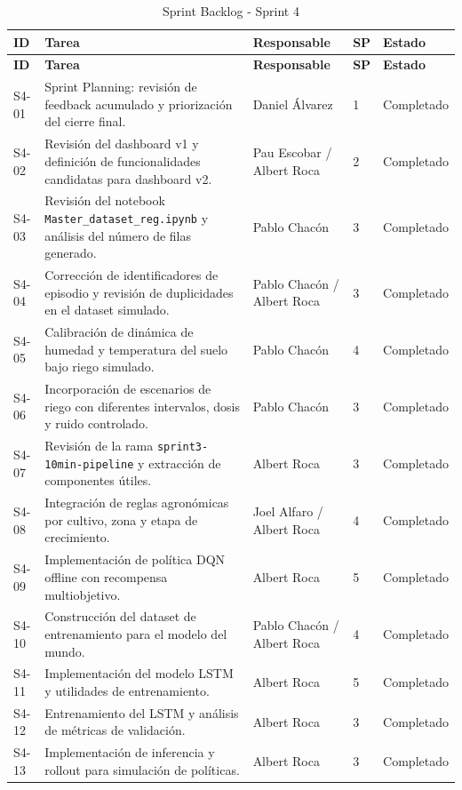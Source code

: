 \documentclass[11pt,a4paper]{article}
\begin{document}
\begin{longtable}{p{}p{}p{}p{}p{}}
\caption{Sprint Backlog - Sprint 4}\\
\toprule
\textbf{ID} & \textbf{Tarea} & \textbf{Responsable} & \textbf{SP} & \textbf{Estado} \\
\midrule
\endfirsthead
\toprule
\textbf{ID} & \textbf{Tarea} & \textbf{Responsable} & \textbf{SP} & \textbf{Estado} \\
\midrule
\endhead
S4-01 & Sprint Planning: revisión de feedback acumulado y priorización del cierre final. & Daniel Álvarez & 1 & Completado \\
S4-02 & Revisión del dashboard v1 y definición de funcionalidades candidatas para dashboard v2. & Pau Escobar / Albert Roca & 2 & Completado \\
S4-03 & Revisión del notebook \texttt{Master\_dataset\_reg.ipynb} y análisis del número de filas generado. & Pablo Chacón & 3 & Completado \\
S4-04 & Corrección de identificadores de episodio y revisión de duplicidades en el dataset simulado. & Pablo Chacón / Albert Roca & 3 & Completado \\
S4-05 & Calibración de dinámica de humedad y temperatura del suelo bajo riego simulado. & Pablo Chacón & 4 & Completado \\
S4-06 & Incorporación de escenarios de riego con diferentes intervalos, dosis y ruido controlado. & Pablo Chacón & 3 & Completado \\
S4-07 & Revisión de la rama \texttt{sprint3-10min-pipeline} y extracción de componentes útiles. & Albert Roca & 3 & Completado \\
S4-08 & Integración de reglas agronómicas por cultivo, zona y etapa de crecimiento. & Joel Alfaro / Albert Roca & 4 & Completado \\
S4-09 & Implementación de política DQN offline con recompensa multiobjetivo. & Albert Roca & 5 & Completado \\
S4-10 & Construcción del dataset de entrenamiento para el modelo del mundo. & Pablo Chacón / Albert Roca & 4 & Completado \\
S4-11 & Implementación del modelo LSTM y utilidades de entrenamiento. & Albert Roca & 5 & Completado \\
S4-12 & Entrenamiento del LSTM y análisis de métricas de validación. & Albert Roca & 3 & Completado \\
S4-13 & Implementación de inferencia y rollout para simulación de políticas. & Albert Roca & 3 & Completado \\

\end{longtable}
\end{document}
